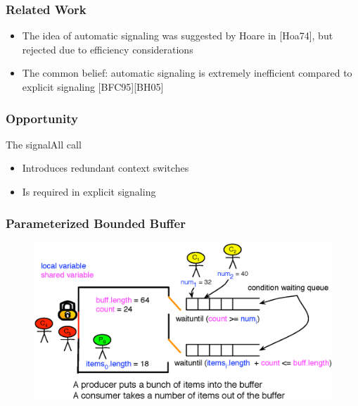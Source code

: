 \documentclass[mathserif,14pt,xcolor=table]{beamer}
\begin{document}
\begin{frame}
    \frametitle{Related Work} 
    \begin{itemize}
        \item The idea of automatic signaling was suggested 
            by Hoare in [Hoa74], but rejected due to efficiency considerations  
        \item The common belief: automatic signaling is extremely
            inefficient compared to explicit signaling [BFC95][BH05]
    \end{itemize}
\end{frame}

\begin{frame}
    \frametitle{Opportunity}
    The signalAll call
    \begin{itemize}
        \item Introduces redundant context switches
        \item Is required in explicit signaling 
    \end{itemize}
\end{frame}

\begin{frame}
    \frametitle{Parameterized Bounded Buffer}
    \begin{figure}[ht!]
        \centering
        \includegraphics[scale=0.75]{fig/pbb.eps}
        \label{fig:fw}
    \end{figure}
\end{frame}

\end{document}
